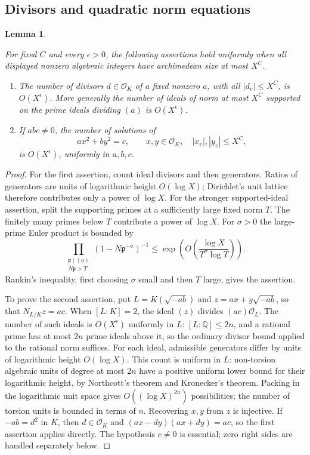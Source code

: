 \documentclass[11pt]{amsart}
\newtheorem{lemma}[theorem]{Lemma}
\theoremstyle{definition}
\numberwithin{equation}{section}
\begin{document}
\subsection{Divisors and quadratic norm equations}
\begin{lemma}\label{lem:divisor-norm-counts}

For fixed $C$ and every $\epsilon>0$, the following assertions hold uniformly
when all displayed nonzero algebraic integers have archimedean size at most $X^C$.

\begin{enumerate}
\item The number of divisors $d\in\mathcal O_K$ of a fixed nonzero $a$, with
all $|d_v|\le X^C$, is $O(X^\epsilon)$.  More generally the number of ideals
of norm at most $X^C$ supported on the prime ideals dividing $(a)$ is
$O(X^\epsilon)$.
\item If $abc\ne0$, the number of solutions of
\begin{equation}\label{eq:g6-binary}
 ax^2+by^2=c,
 \qquad x,y\in\mathcal O_K,\quad |x_v|,|y_v|\le X^C,
\end{equation}
is $O(X^\epsilon)$, uniformly in $a,b,c$.
\end{enumerate}

\end{lemma}
\begin{proof}
For the first assertion, count ideal divisors and then generators.  Ratios of
generators are units of logarithmic height $O(\log X)$; Dirichlet's unit lattice
therefore contributes only a power of $\log X$.  For the stronger supported-ideal
assertion, split the supporting primes at a sufficiently large fixed norm $T$.
The finitely many primes below $T$ contribute a power of $\log X$.
For $\sigma>0$ the large-prime Euler product is bounded by
\[
 \prod_{\substack{\mathfrak p\mid(a)\\N\mathfrak p>T}}
 (1-N\mathfrak p^{-\sigma})^{-1}
 \le \exp\!\left(O\!\left(\frac{\log X}{T^\sigma\log T}\right)\right).
\]
Rankin's inequality, first choosing $\sigma$ small and then $T$ large, gives
the assertion.

To prove the second assertion, put $L=K(\sqrt{-ab})$ and
$z=ax+y\sqrt{-ab}$, so that $N_{L/K}z=ac$.
When $[L:K]=2$, the ideal $(z)$ divides $(ac)\mathcal O_L$.
The number of such ideals is $O(X^\epsilon)$ uniformly in $L$:
$[L:\mathbb Q]\le2n$, and a rational prime has at most $2n$ prime ideals above it,
so the ordinary divisor bound applied to the rational norm suffices.
For each ideal, admissible generators differ by units of logarithmic height
$O(\log X)$.  This count is uniform in $L$: non-torsion algebraic units of
degree at most $2n$ have a positive uniform lower bound for their logarithmic
height, by Northcott's theorem and Kronecker's theorem.  Packing in the
logarithmic unit space gives $O((\log X)^{2n})$ possibilities; the number of
torsion units is bounded in terms of $n$.  Recovering $x,y$ from $z$ is injective.
If $-ab=d^2$ in $K$, then $d\in\mathcal O_K$ and
$(ax-dy)(ax+dy)=ac$, so the first assertion applies directly.
The hypothesis $c\ne0$ is essential; zero right sides are handled separately below.

\end{proof}
\end{document}
